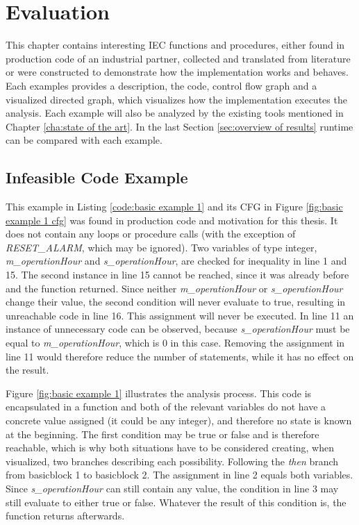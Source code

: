 
\chapter {Evaluation}
\label {cha:evaluation}
This chapter contains interesting IEC functions and procedures, either found in production code of an industrial partner, collected and translated from literature or were constructed to demonstrate how the implementation works and behaves.
Each examples provides a description, the code, control flow graph and a visualized directed graph, which visualizes how the implementation executes the analysis. Each example will also be analyzed by the existing tools mentioned in Chapter \ref{cha:state of the art}. In the last Section \ref{sec:overview of results} runtime can be compared with each example.

\section{Infeasible Code Example}
This example in Listing \ref{code:basic example 1} and its CFG in Figure \ref{fig:basic example 1 cfg} was found in production code and motivation for this thesis. It does not contain any loops or procedure calls (with the exception of \emph{RESET\_ALARM}, which may be ignored). Two variables of type integer, \emph{m\_operationHour} and \emph{s\_operationHour}, are checked for inequality in line 1 and 15. The second instance in line 15 cannot be reached, since it was already before and the function returned. Since neither \emph{m\_operationHour} or \emph{s\_operationHour} change their value, the second condition will never evaluate to true, resulting in unreachable code in line 16. This assignment will never be executed. 
In line 11 an instance of unnecessary code can be observed, because \emph{s\_operationHour} must be equal to \emph{m\_operationHour}, which is 0 in this case. Removing the assignment in line 11 would therefore reduce the number of statements, while it has no effect on the result.


Figure \ref{fig:basic example 1} illustrates the analysis process. This code is encapsulated in a function and both of the relevant variables do not have a concrete value assigned (it could be any integer), and therefore no state is known at the beginning. The first condition may be true or false and is therefore reachable, which is why both situations have to be considered creating, when visualized, two branches describing each possibility. Following the \emph{then} branch from basicblock 1 to basicblock 2. The assignment in line 2 equals both variables. Since \emph{s\_operationHour} can still contain any value, the condition in line 3 may still evaluate to either true or false. Whatever the result of this condition is, the function returns afterwards.

